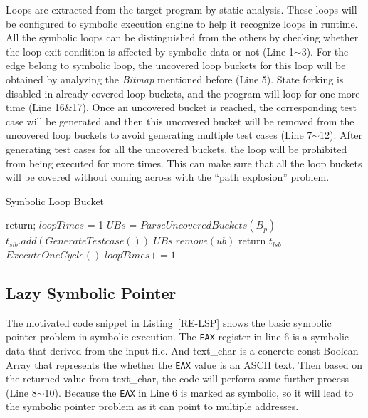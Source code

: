 Loops are extracted from the target program by static analysis. These loops will be configured to symbolic execution engine to help it recognize loops in runtime. All the symbolic loops can be distinguished from the others by checking whether the loop exit condition is affected by symbolic data or not (Line 1$\sim$3). For the edge belong to symbolic loop, the uncovered loop buckets for this loop will be obtained by analyzing the \textit{Bitmap} mentioned before (Line 5). 
State forking is disabled in already covered loop buckets, and the program will loop for one more time (Line 16\&17). Once an uncovered bucket is reached, the corresponding test case will be generated and then this uncovered bucket will be removed from the uncovered loop buckets to avoid generating multiple test cases (Line 7$\sim$12). After generating test cases for all the uncovered buckets, the loop will be prohibited from being executed for more times. This can make sure that all the loop buckets will be covered without coming across with the ``path explosion'' problem.

\begin{algorithm}
  \caption{Symbolic Loop Bucket}
  \label{SLB}
  {
    return;
  }
  $loopTimes$ = 1\;
  $UBs$ = $ParseUncoveredBuckets(B_p)$\;
  {
    {
      {
        $t_{slb}.add(GenerateTestcase())$\;
        $UBs$.$remove(ub)$\;
      }
    }
    {
      return $t_{lsb}$\;
    }{
      $ExecuteOneCycle()$\;
      $loopTimes += 1$\;
    }
  }
\end{algorithm}  

\subsection{Lazy Symbolic Pointer}
The motivated code snippet in Listing~\ref{RE-LSP} shows the basic symbolic pointer problem in symbolic execution. The \texttt{EAX} register in line 6 is a symbolic data that derived from the input file. And text\_char is a concrete const Boolean Array that represents the whether the \texttt{EAX} value is an ASCII text. Then based on the returned value from text\_char, the code will perform some further process (Line 8$\sim$10). Because the \texttt{EAX} in Line 6 is marked as symbolic, so it will lead to the symbolic pointer problem as it can point to multiple addresses.


